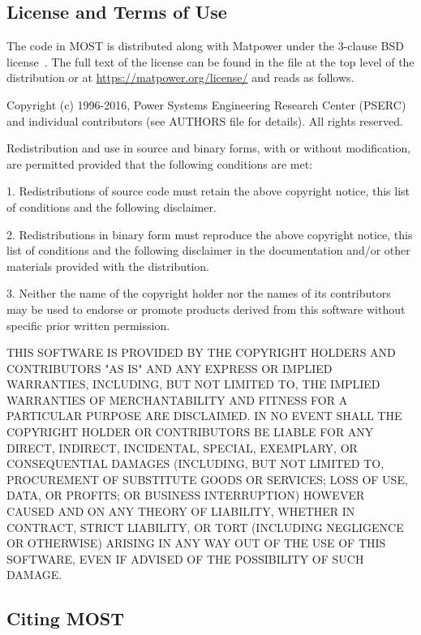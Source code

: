 \documentclass[12pt]{article}
\newcommand{\matpower}[0]{{\sc Matpower}}
\newcommand{\most}[0]{{MOST}}
\newcommand{\code}[1]{{\relsize{-0.5}{\tt{{#1}}}}}  %
\numberwithin{equation}{section}
\numberwithin{table}{section}
\numberwithin{figure}{section}
\begin{document}
\subsection{License and Terms of Use}

The code in \most{} is distributed along with \matpower{} under the 3-clause BSD license~\cite{bsd}. The full text of the license can be found in the \code{LICENSE} file at the top level of the distribution or at \url{https://matpower.org/license/} and reads as follows.

\begin{Notice}
Copyright (c) 1996-2016, Power Systems Engineering Research Center
(PSERC) and individual contributors (see AUTHORS file for details).
All rights reserved.

Redistribution and use in source and binary forms, with or without
modification, are permitted provided that the following conditions
are met:

1. Redistributions of source code must retain the above copyright
notice, this list of conditions and the following disclaimer.

2. Redistributions in binary form must reproduce the above copyright
notice, this list of conditions and the following disclaimer in the
documentation and/or other materials provided with the distribution.

3. Neither the name of the copyright holder nor the names of its
contributors may be used to endorse or promote products derived from
this software without specific prior written permission.

THIS SOFTWARE IS PROVIDED BY THE COPYRIGHT HOLDERS AND CONTRIBUTORS
"AS IS" AND ANY EXPRESS OR IMPLIED WARRANTIES, INCLUDING, BUT NOT
LIMITED TO, THE IMPLIED WARRANTIES OF MERCHANTABILITY AND FITNESS
FOR A PARTICULAR PURPOSE ARE DISCLAIMED. IN NO EVENT SHALL THE
COPYRIGHT HOLDER OR CONTRIBUTORS BE LIABLE FOR ANY DIRECT, INDIRECT,
INCIDENTAL, SPECIAL, EXEMPLARY, OR CONSEQUENTIAL DAMAGES (INCLUDING,
BUT NOT LIMITED TO, PROCUREMENT OF SUBSTITUTE GOODS OR SERVICES;
LOSS OF USE, DATA, OR PROFITS; OR BUSINESS INTERRUPTION) HOWEVER
CAUSED AND ON ANY THEORY OF LIABILITY, WHETHER IN CONTRACT, STRICT
LIABILITY, OR TORT (INCLUDING NEGLIGENCE OR OTHERWISE) ARISING IN
ANY WAY OUT OF THE USE OF THIS SOFTWARE, EVEN IF ADVISED OF THE
POSSIBILITY OF SUCH DAMAGE.
\end{Notice}

\subsection{Citing \most{}}
\end{document}
